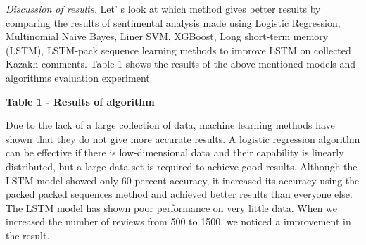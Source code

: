 \emph{Discussion of results.} Let' s look at which method
gives better results by comparing the results of sentimental analysis
made using Logistic Regression, Multinomial Naive Bayes, Liner SVM,
XGBoost, Long short-term memory (LSTM), LSTM-pack sequence learning
methods to improve LSTM on collected Kazakh comments. Table 1 shows the
results of the above-mentioned models and algorithms evaluation
experiment

{\bfseries Table 1 - Results of algorithm}


Due to the lack of a large collection of data, machine learning methods
have shown that they do not give more accurate results. A logistic
regression algorithm can be effective if there is low-dimensional data
and their capability is linearly distributed, but a large data set is
required to achieve good results. Although the LSTM model showed only 60
percent accuracy, it increased its accuracy using the packed packed
sequences method and achieved better results than everyone else. The
LSTM model has shown poor performance on very little data. When we
increased the number of reviews from 500 to 1500, we noticed a
improvement in the result.

